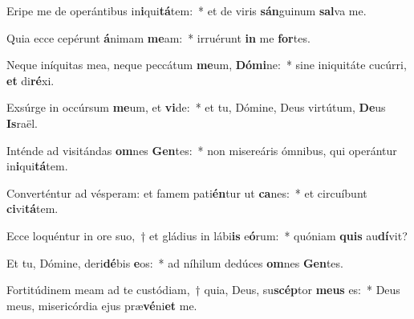 \item Eripe me de operántibus in\textbf{i}qui\textbf{tá}tem:~* et de viris \textbf{sán}guinum \textbf{sal}va me.
\item Quia ecce cepérunt \textbf{á}nimam \textbf{me}am:~* irruérunt \textbf{in} me \textbf{for}tes.
\item Neque iníquitas mea, neque peccátum \textbf{me}um, \textbf{Dó}\textbf{mi}ne:~* sine iniquitáte cucúrri, \textbf{et} di\textbf{ré}xi.
\item Exsúrge in occúrsum \textbf{me}um, et \textbf{vi}de:~* et tu, Dómine, Deus virtútum, \textbf{De}us \textbf{Is}raël.
\item Inténde ad visitándas \textbf{om}nes \textbf{Gen}tes:~* non misereáris ómnibus, qui operántur in\textbf{i}qui\textbf{tá}tem.
\item Converténtur ad vésperam: et famem pati\textbf{én}tur ut \textbf{ca}nes:~* et circuíbunt \textbf{ci}vi\textbf{tá}tem.
\item Ecce loquéntur in ore suo,~† et gládius in lábi\textbf{is} e\textbf{ó}rum:~* quóniam \textbf{quis} au\textbf{dí}vit?
\item Et tu, Dómine, deri\textbf{dé}bis \textbf{e}os:~* ad níhilum dedúces \textbf{om}nes \textbf{Gen}tes.
\item Fortitúdinem meam ad te custódiam,~† quia, Deus, su\textbf{scép}tor \textbf{me}\textbf{us} es:~* Deus meus, misericórdia ejus præ\textbf{vé}ni\textbf{et} me.
